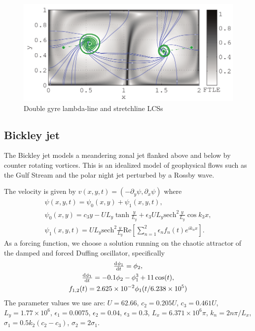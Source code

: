 \documentclass{article}
\begin{document}
\begin{figure}
\centering
\includegraphics[width=\textwidth]{graphics/double_gyre/lambda_stretch_lcs}
\caption{Double gyre lambda-line and stretchline LCSs}
\label{fig:double_gyre_lambda_stretch_lcs}
\end{figure}

\clearpage

\subsection{Bickley jet}

The Bickley jet models a meandering zonal jet flanked above and below by
counter rotating vortices. This is an idealized model of geophysical flows such as the Gulf Stream and the polar night jet perturbed by a Rossby wave\parencite{castilloNegrete93:_chaot_rossb,beron-vera10:_invar_lagran}.

The velocity is given by $v(x,y,t) = (-\partial_y \psi, \partial_x \psi)$ where
\begin{gather*}
\psi(x,y,t) = \psi_0(x,y) + \psi_1(x,y,t),\\
\psi_0(x,y) = c_3 y - U L_y \tanh\frac{y}{L_y} + \epsilon_3 U L_y \mathrm{sech}^2\frac{y}{L_y} \cos k_3 x,\\
\psi_1(x,y,t) = U L_y \mathrm{sech}^2\frac{y}{L_y} \mathrm{Re}\left[ \sum_{n=1}^2 \epsilon_n f_n(t) e^{i k_n x}\right].
\end{gather*}
As a forcing function, we choose a solution running on the chaotic attractor of the damped and forced Duffing oscillator, specifically
\begin{gather*}
\od{\phi_1}{t} = \phi_2,\\
\od{\phi_1}{t} = -0.1 \phi_2 - \phi_1^3 + 11 \cos(t),\\
f_{1,2}(t) = 2.625 \times 10^{-2} \phi_1(t/6.238 \times 10^5)
\end{gather*}
The parameter values we use are: $U = 62.66$, $c_2 = 0.205 U$, $c_3 = 0.461 U$, $L_y = 1.77 \times 10^6$, $\epsilon_1 = 0.0075$, $\epsilon_2 = 0.04$, $\epsilon_3 = 0.3$, $L_x = 6.371 \times 10^6 \pi$, $k_n = 2 n \pi/L_x$, $\sigma_1 = 0.5 k_2 (c_2 - c_3)$, $\sigma_2 = 2 \sigma_1$.
\end{document}
